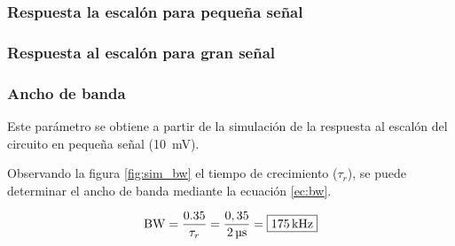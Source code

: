 \subsubsection{Respuesta la escalón para pequeña señal}



\subsubsection{Respuesta al escalón para gran señal}



\subsubsection{Ancho de banda}

	Este parámetro se obtiene a partir de la simulación de la respuesta al escalón del circuito en pequeña señal (\SI{10}{\milli\volt}).
	


	Observando la figura \ref{fig:sim_bw} el tiempo de crecimiento ($\tau_r$), se puede determinar el ancho de banda mediante la ecuación \eqref{ec:bw}.

	\begin{equation}
		\centering
		\mathrm{BW} = \frac{\num{0,35}}{\tau_r} = \frac{0,35}{\SI{2}{\micro\second}} = \boxed{\SI{175}{\kilo\hertz}}
		\label{ec:bw}
	\end{equation}


